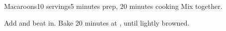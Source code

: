 \documentclass[../Cookbook.tex]{subfiles}
\begin{document}
\begin{recipe}[Macaroons]{Macaroons}{10 servings}{5 minutes prep, 20 minutes cooking}
Mix together.

Add and beat in.
Bake 20 minutes at , until lightly browned.
\end{recipe}
\end{document}
